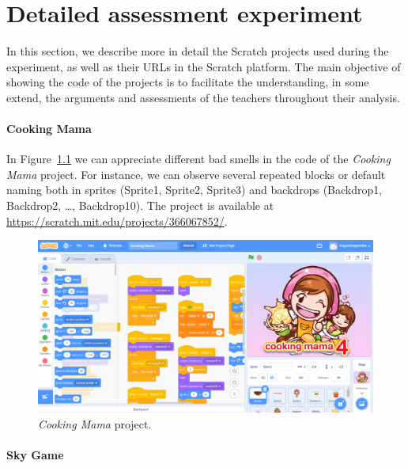 

\cleardoublepage
\appendix
\chapter{Detailed assessment experiment}
\label{app:experiment}

In this section, we describe more in detail the Scratch projects used during the experiment, as well as their URLs in the Scratch platform. The main objective of showing the code of the projects is to facilitate the understanding, in some extend, the arguments and assessments of the teachers throughout their analysis.


\subsubsection{Cooking Mama}
\label{subsubsec:cooking_mama}

In Figure~\ref{fig:cooking_mama} we can appreciate different bad smells in the code of the \textit{Cooking Mama} project. For instance, we can observe several repeated blocks or default naming both in sprites (Sprite1, Sprite2, Sprite3) and backdrops (Backdrop1, Backdrop2, \ldots, Backdrop10). The project is available at \url{https://scratch.mit.edu/projects/366067852/}.  

 \begin{figure}
    \centering
    \includegraphics[width=12cm,                         keepaspectratio]{img/cooking_mama.png}
    \caption{\textit{Cooking Mama} project.}
    \label{fig:cooking_mama}
\end{figure}


\subsubsection{Sky Game}
\label{subsubsec:sky_game}

